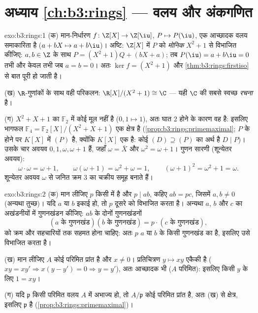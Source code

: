 \section*{अध्याय \ref{ch:b3:rings} --- वलय और अंकगणित}

\begin{solution}{exo:b3:rings:1}
(क) मान-निर्धारण $f \colon \Z[X] \to \Z[\iu]$, $P \mapsto P(\iu)$, एक आच्छादक वलय समाकारिता है ($a + bX \mapsto a + b\iu$)।
अष्टि: $\Z[X]$ में $P$ को \emph{मोनिक} $X^2 + 1$ से विभाजित कीजिए: $a, b \in \Z$ के
साथ $P = (X^2 +
1)Q + (bX + a)$; तब $P(\iu) = a + b\iu = 0$ तभी और केवल तभी जब $a = b = 0$। अतः $\ker f = (X^2+1)$ और \cref{thm:b3:rings:firstiso} से बात
पूरी हो जाती है।

(ख) $\R$-गुणांकों के साथ वही परिकलन: $\R[X]/(X^2+1)
\cong \C$ --- यही $\C$ की सबसे
स्वच्छ \emph{रचना} है।

(ग) $X^2 + X + 1$ का $\mathbb F_2$ में कोई मूल नहीं है ($0, 1 \mapsto 1$), अतः घात $2$ होने के
कारण वह  है: इसलिए भागफल $\mathbb
F_4 = \mathbb F_2[X]/(X^2+X+1)$ एक क्षेत्र है (\cref{prop:b3:rings:primemaximal}; $P$ के
 होने पर $K[X]$ में $(P)$  है, क्योंकि $K[X]$ एक  है:
कोई  $(D) \supseteq
(P)$ का अर्थ है $D \mid P$)। उसके चार अवयव $0, 1, \omega,
\omega + 1$ हैं, जहाँ $\omega = \bar X$
और $\omega^2 = \omega + 1$। गुणन सारणी (शून्येतर अवयव):
\[
\omega \cdot \omega = \omega + 1, \qquad
\omega(\omega + 1) = \omega^2 + \omega = 1, \qquad
(\omega+1)^2 = \omega^2 + 1 = \omega .
\]
शून्येतर अवयव $\omega$ से जनित क्रम $3$ का चक्रीय समूह बनाते हैं।
\end{solution}

\begin{solution}{exo:b3:rings:2}
(क) मान लीजिए $p$ किसी  में  है और $p \mid ab$, कहिए $ab =
pc$, जिसमें
$a, b \neq 0$ (अन्यथा तुच्छ)। यदि $a$ या $b$ इकाई हो, तो $p$ दूसरे को
विभाजित करता है। अन्यथा $a$, $b$ और $c$ का अखंडनीयों में गुणनखंडन
कीजिए: $ab$ के दोनों गुणनखंडनों
\[
(a \text{ के गुणनखंड})(b \text{ के गुणनखंड}) = p \cdot
(c \text{ के गुणनखंड}),
\]
को क्रम और सहचारियों तक सहमत होना चाहिए: अतः $p$ $a$ या $b$ के
किसी  गुणनखंड का  है, इसलिए उसे विभाजित करता है।

(ख) मान लीजिए $A$ कोई परिमित प्रांत है और $x \neq 0$। प्रतिचित्रण $y \mapsto
xy$
एकैकी है ($xy = xy' \Rightarrow x(y - y') = 0 \Rightarrow
y = y'$), अतः आच्छादक भी ($A$ परिमित): इसलिए किसी $y$ के
लिए $1 = xy$।

(ग) यदि $\mathfrak p$ किसी परिमित वलय $A$ में अभाज्य हो, तो $A/\mathfrak p$ कोई परिमित
प्रांत है, अतः (ख) से क्षेत्र, इसलिए $\mathfrak p$  है (\cref{prop:b3:rings:primemaximal})।
\end{solution}

